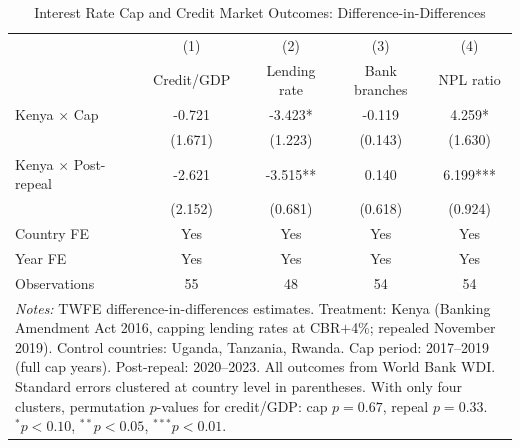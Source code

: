 \begin{table}[htbp]
\centering
\caption{Interest Rate Cap and Credit Market Outcomes: Difference-in-Differences}
\label{tab:main_did}
\begin{tabular}{lcccc}
\hline\hline
 & (1) & (2) & (3) & (4) \\
 & Credit/GDP & Lending rate & Bank branches & NPL ratio \\
\hline
  Kenya $\times$ Cap & -0.721 & -3.423* & -0.119 & 4.259* \\
   & (1.671) & (1.223) & (0.143) & (1.630) \\
  Kenya $\times$ Post-repeal & -2.621 & -3.515** & 0.140 & 6.199*** \\
   & (2.152) & (0.681) & (0.618) & (0.924) \\
\hline
  Country FE & Yes & Yes & Yes & Yes \\
  Year FE & Yes & Yes & Yes & Yes \\
  Observations & 55 & 48 & 54 & 54 \\
\hline\hline
\multicolumn{5}{p{0.93\textwidth}}{\footnotesize \textit{Notes:} TWFE difference-in-differences estimates. Treatment: Kenya (Banking Amendment Act 2016, capping lending rates at CBR$+$4\%; repealed November 2019). Control countries: Uganda, Tanzania, Rwanda. Cap period: 2017--2019 (full cap years). Post-repeal: 2020--2023. All outcomes from World Bank WDI. Standard errors clustered at country level in parentheses. With only four clusters, permutation $p$-values for credit/GDP: cap $p=0.67$, repeal $p=0.33$. $^{*}p<0.10$, $^{**}p<0.05$, $^{***}p<0.01$.}
\end{tabular}
\end{table}
